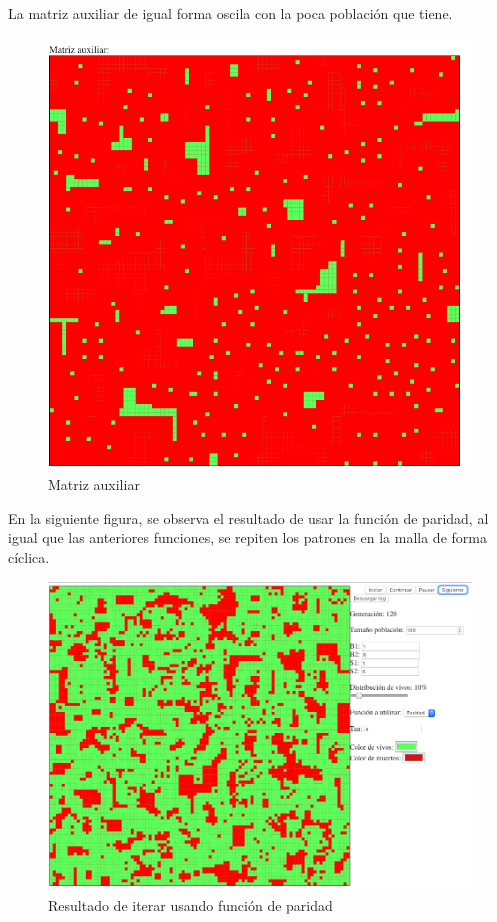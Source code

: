 	La matriz auxiliar de igual forma oscila con la poca población que tiene.
	\begin{figure}[H]
		\begin{center}
			\includegraphics[scale=.3]{GOLM/img/regla1616-2-1.png}
			\caption{Matriz auxiliar}
			\label{fig:golm19}
		\end{center}
	\end{figure}

	En la siguiente figura, se observa el resultado de usar la función de paridad, al igual que las anteriores funciones, se repiten los patrones en la malla de forma cíclica.
	\begin{figure}[H]
		\begin{center}
			\includegraphics[scale=.3]{GOLM/img/regla1616-3.png}
			\caption{Resultado de iterar usando función de paridad}
			\label{fig:golm20}
		\end{center}
	\end{figure}

